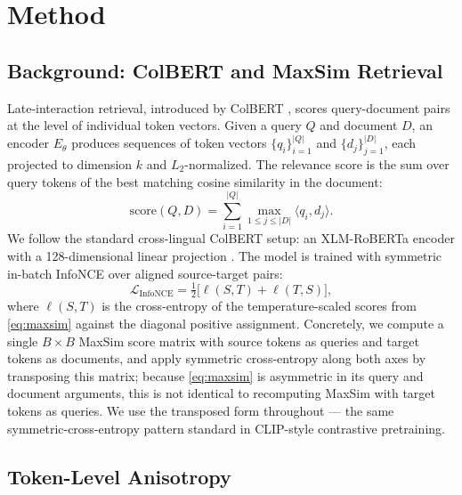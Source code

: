 \section{Method}
\label{sec:method}

\subsection{Background: ColBERT and MaxSim Retrieval}
\label{sec:method-background}

Late-interaction retrieval, introduced by ColBERT \citep{khattab2020colbert}, scores query-document pairs at the level of individual token vectors. Given a query $Q$ and document $D$, an encoder $E_\theta$ produces sequences of token vectors $\{q_i\}_{i=1}^{|Q|}$ and $\{d_j\}_{j=1}^{|D|}$, each projected to dimension $k$ and $L_2$-normalized. The relevance score is the sum over query tokens of the best matching cosine similarity in the document:
\begin{equation}
\label{eq:maxsim}
\mathrm{score}(Q, D) = \sum_{i=1}^{|Q|} \max_{1 \le j \le |D|} \langle q_i, d_j \rangle.
\end{equation}
We follow the standard cross-lingual ColBERT setup: an XLM-RoBERTa encoder with a 128-dimensional linear projection \citep{conneau2020xlmr}. The model is trained with symmetric in-batch InfoNCE \citep{gao2021simcse,wang2020understanding} over aligned source-target pairs:
\begin{equation}
\label{eq:infonce}
\mathcal{L}_{\mathrm{InfoNCE}} = \tfrac{1}{2}\bigl[ \ell(S, T) + \ell(T, S) \bigr],
\end{equation}
where $\ell(S, T)$ is the cross-entropy of the temperature-scaled scores from \eqref{eq:maxsim} against the diagonal positive assignment. Concretely, we compute a single $B \times B$ MaxSim score matrix with source tokens as queries and target tokens as documents, and apply symmetric cross-entropy along both axes by transposing this matrix; because \eqref{eq:maxsim} is asymmetric in its query and document arguments, this is not identical to recomputing MaxSim with target tokens as queries. We use the transposed form throughout — the same symmetric-cross-entropy pattern standard in CLIP-style contrastive pretraining.

\subsection{Token-Level Anisotropy}
\label{sec:method-anisotropy}

